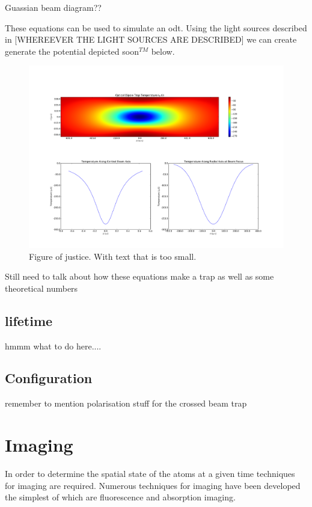 {\color{red} Guassian beam diagram??}

These equations can be used to simulate an \gls{odt}. Using the light sources described in {\color{red} [WHEREEVER THE LIGHT SOURCES ARE DESCRIBED]} we can create generate the potential depicted {\color{red} soon$^{TM}$} below.

\begin{figure}
\centering
\includegraphics[width=15cm]{figs/dipolepotential.pdf}
\caption{{\color{red}Figure of justice. With text that is too small.}}
\end{figure}

{\color{red} Still need to talk about how these equations make a trap as well as some theoretical numbers}

\subsection{lifetime}

{\color{red} hmmm what to do here....}

\subsection{Configuration}

remember to mention polarisation stuff for the crossed beam trap

\section{Imaging}

In order to determine the spatial state of the atoms at a given time techniques for imaging are required. Numerous techniques for imaging have been developed the simplest of which are fluorescence and absorption imaging.

